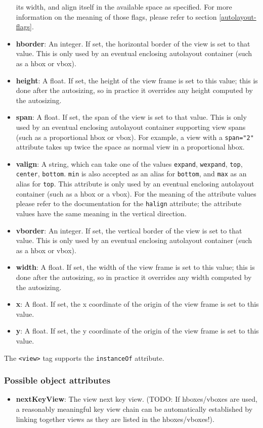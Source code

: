 \begin{itemize}
its width, and align itself in the available space as specified.  For
more information on the meaning of those flags, please refer to
section \ref{autolayout-flags}.
\item {\bf hborder}: An integer.  If set, the horizontal border of the view
is set to that value.  This is only used by an eventual enclosing
autolayout container (such as a hbox or vbox).
\item {\bf height}: A float.  If set, the height of the view frame is set 
to this value; this is done after the autosizing, so in practice it
overrides any height computed by the autosizing.
\item {\bf span}: A float.  If set, the span of the view is set to that
value.  This is only used by an eventual enclosing autolayout
container supporting view spans (such as a proportional hbox or vbox).
For example, a view with a \texttt{span="2"} attribute takes up twice
the space as normal view in a proportional hbox.
\item {\bf valign}: A string, which can take one of the values 
\texttt{expand}, \texttt{wexpand}, \texttt{top}, \texttt{center},
\texttt{bottom}.  \texttt{min} is also accepted as an alias for 
\texttt{bottom}, and \texttt{max} as an alias for \texttt{top}.  This
attribute is only used by an eventual enclosing autolayout container
(such as a hbox or a vbox).  For the meaning of the attribute values
please refer to the documentation for the \texttt{halign} attribute;
the attribute values have the same meaning in the vertical direction.
\item {\bf vborder}: An integer.  If set, the vertical border of the view
is set to that value.  This is only used by an eventual enclosing
autolayout container (such as a hbox or vbox).
\item {\bf width}: A float.  If set, the width of the view frame is set 
to this value; this is done after the autosizing, so in practice it
overrides any width computed by the autosizing.
\item {\bf x}: A float.  If set, the x coordinate of the origin of the 
view frame is set to this value.
\item {\bf y}: A float.  If set, the y coordinate of the origin of the 
view frame is set to this value.
\end{itemize}

The \texttt{<view>} tag supports the \texttt{instanceOf} attribute.

\subsubsection{Possible object attributes}
\begin{itemize}
\item {\bf nextKeyView}: The view next key view.  (TODO: If hboxes/vboxes
are used, a reasonably meaningful key view chain can be automatically
established by linking together views as they are listed in the
hboxes/vboxes!).
\end{itemize}

